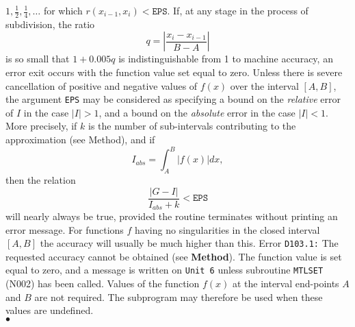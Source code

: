 $1,\frac{1}{2},\frac{1}{4},\ldots $ for which
$r(x_{i-1},x_i) < \mathtt{EPS} $.
If, at any stage in the process of subdivision, the ratio
  $$ q=\left|\frac{x_i-x_{i-1}}{B-A}\right| $$
is so small that $1+0.005q$ is indistinguishable from 1 to
machine accuracy, an error exit occurs with the function value
set equal to zero.
\Accuracy
Unless there is severe cancellation of positive and negative
values of $f(x)$ over the interval $[A,B]$, the argument {\tt EPS}
may be considered as specifying a bound on the {\it relative} error of
$I$ in the case $ |I|>1$, and a bound on the {\it absolute} error in
the case $|I|<1$. More precisely, if $k$ is the number of sub-intervals
contributing to the approximation (see Method), and if
$$ I_{abs} = \int^B_A|f(x)|dx,$$
then the relation
$$ \frac{|G - I|}{I_{abs}+k}< \mathtt{EPS} $$
will nearly always be true, provided the routine terminates
without printing an error message. For functions
$f$ having no singularities in the closed interval $[A,B]$
the accuracy will usually be much higher than this.
\Errorh
Error {\tt D103.1:}  The requested accuracy cannot be
obtained (see {\bf Method}).
The function value is set equal to zero, and a message is written on
{\tt Unit 6} unless subroutine {\tt MTLSET} (N002) has been called.
\Notes
Values of the function $f(x)$ at the interval end-points
$A$ and $B$ are not required. The subprogram may therefore
be used when these values are undefined.
\\ $\bullet$
